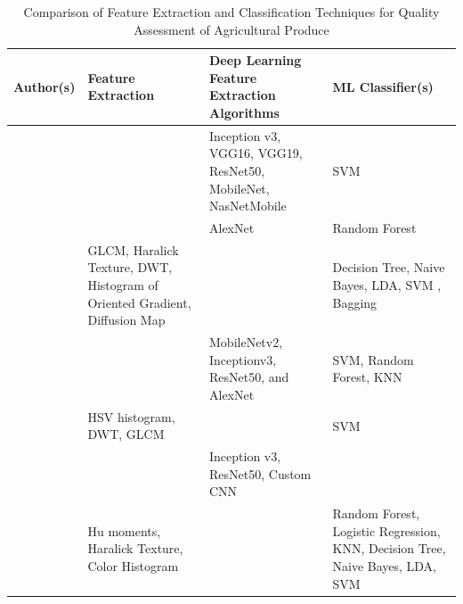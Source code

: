 {\newpage

\begin{table}
	\centering
	\caption{Comparison of Feature Extraction and Classification Techniques for Quality Assessment of Agricultural Produce}
	\label{tab:relatedstudies_three}
	\begin{tabular}{
			>{\centering\arraybackslash}m{2.5cm} 
			>{\centering\arraybackslash}m{5cm}   
			>{\centering\arraybackslash}m{4.5cm} 
			>{\centering\arraybackslash}m{7cm}   
		}
		\toprule
		\textbf{Author(s)} & \textbf{Feature Extraction} & \textbf{Deep Learning Feature Extraction Algorithms} & \textbf{ML Classifier(s)} \\
		\midrule
		
		\citet{haque2022deepnetwork} &
		&
		Inception v3, VGG16, VGG19, ResNet50, MobileNet, NasNetMobile &
		SVM \\
		
		\citet{Kursun2025} &
		&
		AlexNet &
		Random Forest \\
		
		\citet{Wang2024} &
		GLCM, Haralick Texture, DWT, Histogram of Oriented Gradient, Diffusion Map &
		&
		Decision Tree, Naive Bayes,  LDA, SVM , Bagging \\
		
		\citet{Mputu2024} &
		&
		MobileNetv2, Inceptionv3, ResNet50, and AlexNet &
		SVM, Random Forest, KNN \\
		
		\citet{Chandra2024} &
		HSV histogram, DWT, GLCM &
		&
		SVM \\
		
		\citet{Azadnia2023} &
		&
		Inception v3, ResNet50, Custom CNN &
		\\
		
		\citet{Iqbal2020} &
		Hu moments, Haralick Texture, Color Histogram &
		&
		Random Forest, Logistic Regression, KNN, Decision Tree, Naive Bayes, LDA, SVM \\
		
		\bottomrule
	\end{tabular}
\end{table}

\newpage

}
